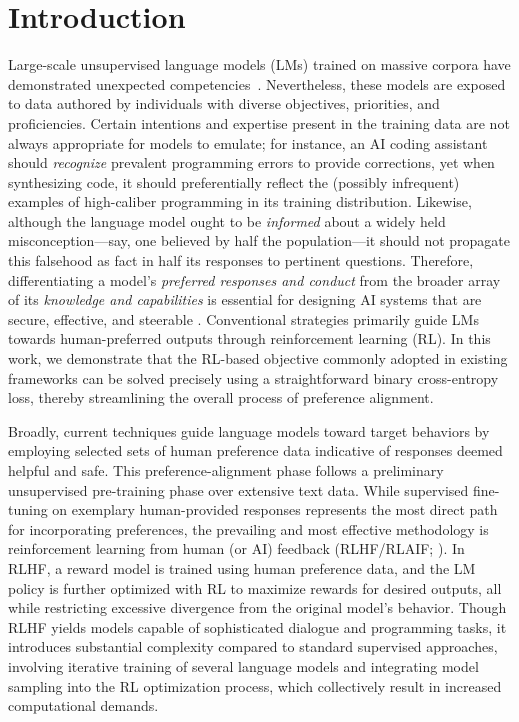 \section{Introduction}
Large-scale unsupervised language models (LMs) trained on massive corpora have demonstrated unexpected competencies~\citep{chowdhery2022palm, brown2020language, touvron2023llama,bubeck2023sparks}. Nevertheless, these models are exposed to data authored by individuals with diverse objectives, priorities, and proficiencies. Certain intentions and expertise present in the training data are not always appropriate for models to emulate; for instance, an AI coding assistant should \textit{recognize} prevalent programming errors to provide corrections, yet when synthesizing code, it should preferentially reflect the (possibly infrequent) examples of high-caliber programming in its training distribution. Likewise, although the language model ought to be \textit{informed} about a widely held misconception—say, one believed by half the population—it should not propagate this falsehood as fact in half its responses to pertinent questions. Therefore, differentiating a model’s \emph{preferred responses and conduct} from the broader array of its \textit{knowledge and capabilities} is essential for designing AI systems that are secure, effective, and steerable \citep{ouyang2022training}. Conventional strategies primarily guide LMs towards human-preferred outputs through reinforcement learning (RL). In this work, we demonstrate that the RL-based objective commonly adopted in existing frameworks can be solved precisely using a straightforward binary cross-entropy loss, thereby streamlining the overall process of preference alignment.

Broadly, current techniques guide language models toward target behaviors by employing selected sets of human preference data indicative of responses deemed helpful and safe. This preference-alignment phase follows a preliminary unsupervised pre-training phase over extensive text data. While supervised fine-tuning on exemplary human-provided responses represents the most direct path for incorporating preferences, the prevailing and most effective methodology is reinforcement learning from human (or AI) feedback (RLHF/RLAIF; \citep{christiano2017deep,bai2022constitutional}). In RLHF, a reward model is trained using human preference data, and the LM policy is further optimized with RL to maximize rewards for desired outputs, all while restricting excessive divergence from the original model’s behavior. Though RLHF yields models capable of sophisticated dialogue and programming tasks, it introduces substantial complexity compared to standard supervised approaches, involving iterative training of several language models and integrating model sampling into the RL optimization process, which collectively result in increased computational demands.

